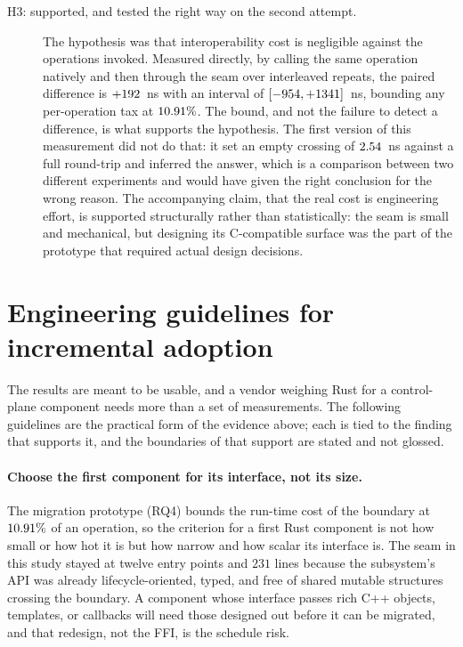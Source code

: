 \documentclass[english,twoside,openright,a4paper,censored,csm,software-track-2020]{HYthesisML}
\begin{document}
\begin{description}
  \item[H3: supported, and tested the right way on the second attempt.] The hypothesis was
        that interoperability cost is negligible against the operations invoked. Measured
        directly, by calling the same operation natively and then through the seam over
        \FfiOpRepeats{} interleaved repeats, the paired difference is $+192$~ns with an
        interval of $[-954, +1341]$~ns, bounding any per-operation tax at
        $10.91\%$. The bound, and not the failure to detect a difference, is what
        supports the hypothesis. The first version of this measurement did not do that: it set
        an empty crossing of $2.54$~ns against a full round-trip and inferred the
        answer, which is a comparison between two different experiments and would have given
        the right conclusion for the wrong reason. The accompanying claim, that the real cost
        is engineering effort, is supported structurally rather than statistically: the seam is
        small and mechanical, but designing its C-compatible surface was the part of the
        prototype that required actual design decisions.
\end{description}

\section{Engineering guidelines for incremental adoption}
\label{sec:guidelines}
The results are meant to be usable, and a vendor weighing Rust for a control-plane component
needs more than a set of measurements. The following guidelines are the practical form of the
evidence above; each is tied to the finding that supports it, and the boundaries of that
support are stated and not glossed.

\paragraph{Choose the first component for its interface, not its size.}
The migration prototype (RQ4) bounds the run-time cost of the boundary at $10.91\%$
of an operation, so the criterion for a first Rust component is not how small or how hot it is
but how narrow and how scalar its interface is. The seam in this study stayed at twelve entry
points and $231$
lines because the subsystem's API was already lifecycle-oriented, typed, and free of shared
mutable structures crossing the boundary. A component whose interface passes rich C++ objects,
templates, or callbacks will need those designed out before it can be migrated, and that
redesign, not the FFI, is the schedule risk.
\end{document}
